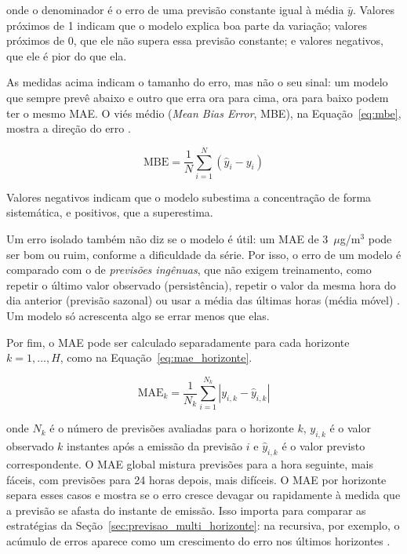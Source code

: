 \noindent onde o denominador é o erro de uma previsão constante igual à média \(\bar{y}\). Valores próximos de 1 indicam que o modelo explica boa parte da variação; valores próximos de 0, que ele não supera essa previsão constante; e valores negativos, que ele é pior do que ela.

As medidas acima indicam o tamanho do erro, mas não o seu sinal: um modelo que sempre prevê abaixo e outro que erra ora para cima, ora para baixo podem ter o mesmo MAE. O viés médio (\textit{Mean Bias Error}, MBE), na Equação~\ref{eq:mbe}, mostra a direção do erro \cite{willmott2005advantages}.

\begin{equation}
    \text{MBE} =
    \frac{1}{N}\sum_{i=1}^{N}(\hat{y}_i - y_i)
    \label{eq:mbe}
\end{equation}

Valores negativos indicam que o modelo subestima a concentração de forma sistemática, e positivos, que a superestima.

Um erro isolado também não diz se o modelo é útil: um MAE de 3~\(\mu\)g/m\(^3\) pode ser bom ou ruim, conforme a dificuldade da série. Por isso, o erro de um modelo é comparado com o de \emph{previsões ingênuas}, que não exigem treinamento, como repetir o último valor observado (persistência), repetir o valor da mesma hora do dia anterior (previsão sazonal) ou usar a média das últimas horas (média móvel) \cite{hyndman2021forecasting}. Um modelo só acrescenta algo se errar menos que elas.

Por fim, o MAE pode ser calculado separadamente para cada horizonte \(k=1,\ldots,H\), como na Equação~\ref{eq:mae_horizonte}.

\begin{equation}
    \text{MAE}_{k} =
    \frac{1}{N_k}\sum_{i=1}^{N_k}|y_{i,k}-\hat{y}_{i,k}|
    \label{eq:mae_horizonte}
\end{equation}

\noindent onde \(N_k\) é o número de previsões avaliadas para o horizonte \(k\), \(y_{i,k}\) é o valor observado \(k\) instantes após a emissão da previsão \(i\) e \(\hat{y}_{i,k}\) é o valor previsto correspondente. O MAE global mistura previsões para a hora seguinte, mais fáceis, com previsões para 24 horas depois, mais difíceis. O MAE por horizonte separa esses casos e mostra se o erro cresce devagar ou rapidamente à medida que a previsão se afasta do instante de emissão. Isso importa para comparar as estratégias da Seção~\ref{sec:previsao_multi_horizonte}: na recursiva, por exemplo, o acúmulo de erros aparece como um crescimento do erro nos últimos horizontes \cite{taieb2012review}.

